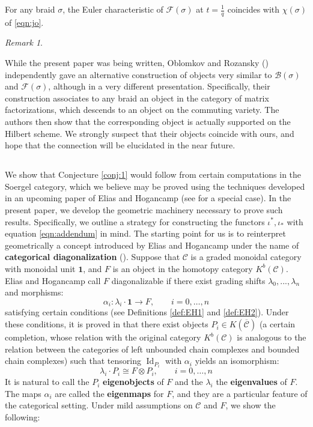 \documentclass[12pt]{amsart}
\numberwithin{equation}{section}
\theoremstyle{definition}
\theoremstyle{remark}
\newtheorem{remark}[theorem]{Remark}
\DeclareMathOperator{\Id}{Id}
\newcommand{\CB}{\mathcal{B}}
\newcommand{\cat}{\mathcal{C}}
\newcommand{\bcat}{\overline{\cat}}
\newcommand{\CF}{\mathcal{F}}
\renewcommand{\1}{\mathbf{1}}
\begin{document}
For any braid $\sigma$, the Euler characteristic of $\CF(\sigma)$ at $t = \frac 1q$ coincides with $\chi(\sigma)$ of \eqref{eqn:jo}. %

\begin{remark}
\label{rem:oblomkov rozansky}

While the present paper was being written, Oblomkov and Rozansky (\cite{OR}) independently gave an alternative construction of objects very similar to $\CB(\sigma)$ and $\CF(\sigma)$, although in a very different presentation. Specifically, their construction associates to any braid an object in the category of matrix factorizations, which descends to an object on the commuting variety. The authors then show that the corresponding object is actually supported on the Hilbert scheme. We strongly suspect that their objects coincide with ours, and hope that the connection will be elucidated in the near future.

\end{remark}

\subsection{}
\label{sub:intro proof}

We show that  Conjecture \ref{conj:1} would follow from certain computations in the Soergel category, which we believe may be proved using the techniques developed in an upcoming paper of Elias and Hogancamp (see \cite{EH1} for a special case). In the present paper, we develop the geometric machinery necessary to prove such results. Specifically, we outline a strategy for constructing  the functors $\iota^*,\iota_*$ with equation \eqref{eqn:addendum} in mind. The starting point for us is to reinterpret geometrically a concept introduced by Elias and Hogancamp under the name of {\bf categorical diagonalization} (\cite{EH}). 
Suppose that $\cat$ is a graded monoidal category with monoidal unit $\mathbf{1}$, and $F$ is an object in the homotopy category $K^b(\cat)$.
Elias and Hogancamp call $F$ diagonalizable if there exist grading shifts $\lambda_0,...,\lambda_n$ and morphisms: 
$$
\alpha_i:\lambda_i \cdot \1\to F, \qquad i=0,\ldots,n
$$
satisfying certain conditions (see Definitions \ref{def:EH1} and \ref{def:EH2}). Under these conditions, it is proved in \cite{EH} that there exist objects $P_i \in K(\bcat)$ (a certain completion, whose relation with the original category $K^b(\cat)$ is analogous to the relation between the categories of left unbounded chain complexes and bounded chain complexes) such that tensoring $\Id_{P_i}$ with $\alpha_i$ yields an isomorphism:
\begin{equation}
\label{eqn:eigen0}
\lambda_i \cdot P_i \cong F \otimes P_i, \qquad i=0,\ldots,n
\end{equation}
It is natural to call the $P_i$ {\bf eigenobjects} of $F$ and the $\lambda_i$ the {\bf eigenvalues} of $F$. The maps $\alpha_i$ are called the {\bf eigenmaps} for $F$, and they are a particular feature of the categorical setting. Under mild assumptions on $\cat$ and $F$, we show the following: \\
\end{document}
